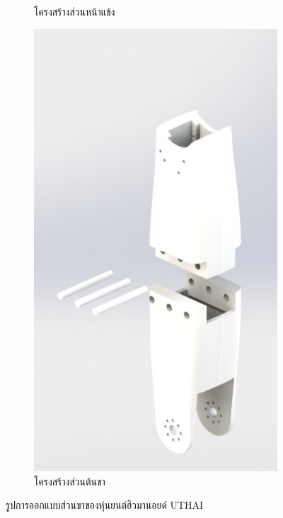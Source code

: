 \begin{figure}[!ht]
\begin{subfigure}[b]{0.3\linewidth}
      \caption{โครงสร้างส่วนหน้าแข้ง}
    \end{subfigure}
    \begin{subfigure}[b]{0.35\linewidth}
      \includegraphics[width=\linewidth]{chapter4/images/thigh.jpg}
      \caption{โครงสร้างส่วนต้นขา}
    \end{subfigure}
    \caption{รูปการออกแบบส่วนขาของหุ่นยนต์ฮิวมานอยด์ UTHAI}
    \label{fig:leg_x}
  \end{figure}

